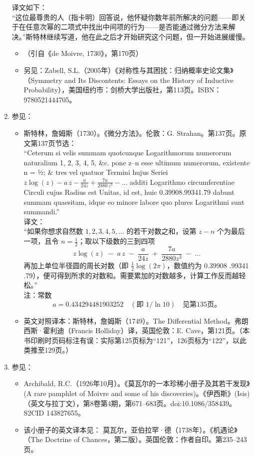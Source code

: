 \begin{enumerate}
译文如下：\\
“这位最尊贵的人（指卡明）回答说，他怀疑你数年前所解决的问题——即关于在任意次幂的二项式中找出中间项的行为——是否能通过微分方法来解决。”斯特林继续写道，他在此之后才开始研究这个问题，但一开始进展缓慢。
\begin{itemize}
\item （引自《de Moivre, 1730》，第170页）
\item 另见：Zabell, S.L.（2005年）《对称性与其困扰：归纳概率史论文集》（Symmetry and Its Discontents: Essays on the History of Inductive Probability），美国纽约市：剑桥大学出版社，第113页。ISBN：9780521444705。
\end{itemize}
\item 参见：
\begin{itemize}
\item 斯特林，詹姆斯（1730）。《微分方法》。伦敦：G. Strahan。第137页。原文第137页节选：\\
“Ceterum si velis summam quotcunque Logarithmorum numerorum naturalium 1, 2, 3, 4, 5, \&c. pone z–n esse ultimum numerorum, existente n = ½; & tres vel quatuor Termini hujus Seriei
$z\log(z) - a\,z - \frac{a}{24z} + \frac{7a}{2880\,z^3} - \dots$
additi Logarithmo circumferentiae Circuli cujus Radius est Unitas, id est, huic 0.39908.99341.79 dabunt summam quaesitam, idque eo minore labore quo plures Logarithmi sunt summandi.”\\
译文：\\
“如果你想求自然数 $1,2,3,4,5,\dots$ 的若干对数之和，设第 $z - n$ 个为最后一项，且令 $n = \tfrac12$；取以下级数的三到四项\\
$$
z\log(z)\;-\;a\,z\;-\;\frac{a}{24z}\;+\;\frac{7a}{2880z^3}\;-\;\dots~
$$
再加上单位半径圆的周长对数（即 $\tfrac12\log(2\pi)$，数值约为 0.39908 .99341 .79），便可得到所求的对数和。需要累加的对数越多，计算工作反而越轻松。”\\
注：常数
$$
a = 0.434294481903252\quad(\text{即 }1/\ln 10)\quad\text{见第135页。}~
$$
\item 英文对照译本：斯特林，詹姆斯（1749）。The Differential Method。弗朗西斯·霍利迪（Francis Holliday）译，英国伦敦：E. Cave，第121页。（本书印刷时页码标注有误：实际第125页标为“121”，126页标为“122”，以此类推至129页。）
\end{itemize}
\item 参见：
\begin{itemize}
\item Archibald, R.C.（1926年10月）。《莫瓦尔的一本珍稀小册子及其若干发现》(A rare pamphlet of Moivre and some of his discoveries)。《伊西斯》(Isis)（英文与拉丁文），第8卷第4期，第671–683页。doi:10.1086/358439。S2CID 143827655。
\item 该小册子的英文译本见：
  莫瓦尔，亚伯拉罕·德（1738年）。《机遇论》（The Doctrine of Chances，第二版）。英国伦敦：作者自印。第235–243页。
\end{itemize}
\end{enumerate}
